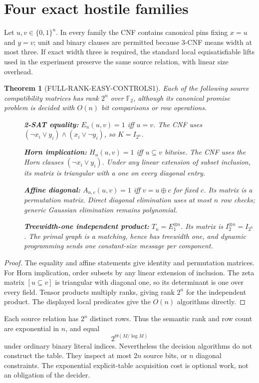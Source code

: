 \documentclass[11pt]{article}
\newtheorem{theorem}{Theorem}
\begin{document}
\section{Four exact hostile families}
Let $u,v\in\{0,1\}^n$.  In every family the CNF contains canonical pins fixing
$x=u$ and $y=v$; unit and binary clauses are permitted because 3-CNF means
width at most three.  If exact width three is required, the standard local
equisatisfiable lifts used in the experiment preserve the same source
relation, with linear size overhead.

\begin{theorem}[FULL-RANK-EASY-CONTROLS1]
Each of the following source compatibility matrices has rank $2^n$ over
$\mathbb F_2$, although its canonical promise problem is decided with $O(n)$
bit comparisons or row operations.
\begin{description}
\item[] \textbf{2-SAT equality:}
$E_n(u,v)=1$ iff $u=v$.  The CNF uses
$(\neg x_i\vee y_i)\wedge(x_i\vee\neg y_i)$, so $K=I_{2^n}$.
\item[] \textbf{Horn implication:}
$H_n(u,v)=1$ iff $u\subseteq v$ bitwise.  The CNF uses the Horn clauses
$(\neg x_i\vee y_i)$.  Under any linear extension of subset inclusion, its
matrix is triangular with a one on every diagonal entry.
\item[] \textbf{Affine diagonal:}
$A_{n,c}(u,v)=1$ iff $v=u\oplus c$ for fixed $c$.  Its matrix is a permutation
matrix.  Direct diagonal elimination uses at most $n$ row checks; generic
Gaussian elimination remains polynomial.
\item[] \textbf{Treewidth-one independent product:}
$T_n=E_1^{\otimes n}$.  Its matrix is $I_2^{\otimes n}=I_{2^n}$.  The primal
graph is a matching, hence has treewidth one, and dynamic programming sends
one constant-size message per component.
\end{description}
\end{theorem}
\begin{proof}
The equality and affine statements give identity and permutation matrices.
For Horn implication, order subsets by any linear extension of inclusion.
The zeta matrix $[u\subseteq v]$ is triangular with diagonal one, so its
determinant is one over every field.  Tensor products multiply ranks, giving
rank $2^n$ for the independent product.  The displayed local predicates give
the $O(n)$ algorithms directly.
\end{proof}

Each source relation has $2^n$ distinct rows.  Thus the semantic rank and row
count are exponential in $n$, and equal
\[
 2^{\Theta(M/\log M)}
\]
under ordinary binary literal indices.  Nevertheless the decision algorithms
do not construct the table.  They inspect at most $2n$ source bits, or $n$
diagonal constraints.  The exponential explicit-table acquisition cost is
optional work, not an obligation of the decider.
\end{document}
